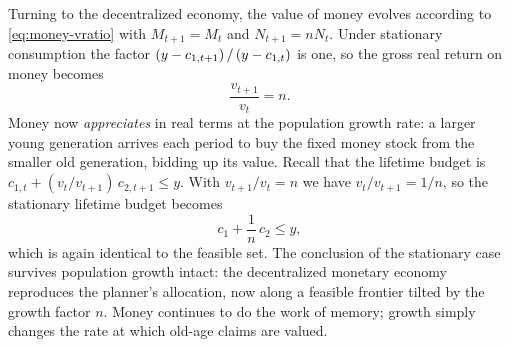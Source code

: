 Turning to the decentralized economy, the value of money evolves according to \eqref{eq:money-vratio} with $M_{t+1} = M_t$ and $N_{t+1} = n N_t$. Under stationary consumption the factor $\left(y - c_{1,t+1}\right)/\left(y - c_{1,t}\right)$ is one, so the gross real return on money becomes
\[
\frac{v_{t+1}}{v_t} = n.
\]
Money now \emph{appreciates} in real terms at the population growth rate: a larger young generation arrives each period to buy the fixed money stock from the smaller old generation, bidding up its value. Recall that the lifetime budget is $c_{1,t} + (v_t/v_{t+1})\,c_{2,t+1} \le y$. With $v_{t+1}/v_t = n$ we have $v_t/v_{t+1} = 1/n$, so the stationary lifetime budget becomes
\[
c_1 + \frac{1}{n}\, c_2 \le y,
\]
which is again identical to the feasible set. The conclusion of the stationary case survives population growth intact: the decentralized monetary economy reproduces the planner's allocation, now along a feasible frontier tilted by the growth factor $n$. Money continues to do the work of memory; growth simply changes the rate at which old-age claims are valued.
